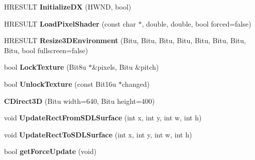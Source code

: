 \begin{DoxyCompactItemize}
\item 
\hypertarget{classCDirect3D_af7252e1b4e62fad15bd0737efaf1020b}{H\-R\-E\-S\-U\-L\-T {\bfseries Initialize\-D\-X} (H\-W\-N\-D, bool)}\label{classCDirect3D_af7252e1b4e62fad15bd0737efaf1020b}

\item 
\hypertarget{classCDirect3D_aa150a4206bea62e1db00c9a578db92d2}{H\-R\-E\-S\-U\-L\-T {\bfseries Load\-Pixel\-Shader} (const char $\ast$, double, double, bool forced=false)}\label{classCDirect3D_aa150a4206bea62e1db00c9a578db92d2}

\item 
\hypertarget{classCDirect3D_a4748ee615a630fc347fcdd12a659a34a}{H\-R\-E\-S\-U\-L\-T {\bfseries Resize3\-D\-Environment} (Bitu, Bitu, Bitu, Bitu, Bitu, Bitu, Bitu, Bitu, bool fullscreen=false)}\label{classCDirect3D_a4748ee615a630fc347fcdd12a659a34a}

\item 
\hypertarget{classCDirect3D_a812efd841357b6eb503d4a98b59dc312}{bool {\bfseries Lock\-Texture} (Bit8u $\ast$\&pixels, Bitu \&pitch)}\label{classCDirect3D_a812efd841357b6eb503d4a98b59dc312}

\item 
\hypertarget{classCDirect3D_aa96cedde54fddd444ddcc594dc5bfb7c}{bool {\bfseries Unlock\-Texture} (const Bit16u $\ast$changed)}\label{classCDirect3D_aa96cedde54fddd444ddcc594dc5bfb7c}

\item 
\hypertarget{classCDirect3D_acf967be6a39166348509f49ef0773747}{{\bfseries C\-Direct3\-D} (Bitu width=640, Bitu height=400)}\label{classCDirect3D_acf967be6a39166348509f49ef0773747}

\item 
\hypertarget{classCDirect3D_acc64918261bd9b867e0d3bf482359140}{void {\bfseries Update\-Rect\-From\-S\-D\-L\-Surface} (int x, int y, int w, int h)}\label{classCDirect3D_acc64918261bd9b867e0d3bf482359140}

\item 
\hypertarget{classCDirect3D_aae6929152c019a8b69afff7d8d06c847}{void {\bfseries Update\-Rect\-To\-S\-D\-L\-Surface} (int x, int y, int w, int h)}\label{classCDirect3D_aae6929152c019a8b69afff7d8d06c847}

\item 
\hypertarget{classCDirect3D_aca465f14d712de242b06a743a7cdc37b}{bool {\bfseries get\-Force\-Update} (void)}\label{classCDirect3D_aca465f14d712de242b06a743a7cdc37b}

\end{DoxyCompactItemize}
